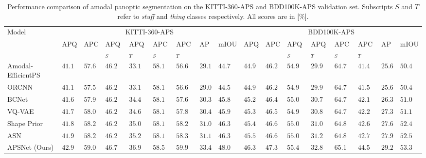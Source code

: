 \documentclass[10pt,twocolumn,letterpaper]{article}
\begin{document}
\begin{table*}
\footnotesize 
\centering
\begin{tabular}{p{2.8cm}|p{0.4cm}p{0.4cm}p{0.5cm}p{0.5cm}p{0.5cm}p{0.5cm}p{0.3cm}p{0.6cm}|p{0.4cm}p{0.4cm}p{0.5cm}p{0.5cm}p{0.5cm}p{0.5cm}p{0.3cm}p{0.5cm}}
\toprule
Model &  \multicolumn{8}{c|}{KITTI-360-APS} & \multicolumn{8}{c}{BDD100K-APS}\\
\cmidrule{2-17}
 &  APQ  & APC & APQ$_S$ &APQ$_T$ & APC$_S$&  APC$_T$ & AP & mIOU & APQ  & APC & APQ$_S$ &APQ$_T$ & APC$_S$&  APC$_T$ & AP & mIOU\\
\midrule
Amodal-EfficientPS & $41.1$ & $57.6$ & $46.2$ & $33.1$ & $58.1$ & $56.6$ & $29.1$ & $44.7$ & $44.9$ & $46.2$ & $54.9$ & $29.9$ & $64.7$ & $41.4$ & $25.6$ & $50.4$ \\
ORCNN~\cite{follmann2019learning}  & $41.1$ & $57.5$ & $46.2$ & $33.1$ & $58.1$ & $56.6$ & $29.0$ & $44.5$ & $44.9$ & $46.2$ & $54.9$ & $29.9$ & $64.7$ & $41.5$ & $25.6$ & $50.4$ \\
BCNet~\cite{Ke_2021_CVPR}  & $41.6$ & $57.9$ & $46.2$ & $34.4$ & $58.1$ & $57.6$ & $30.3$ & $45.8$ & $45.2$ & $46.4$ & $55.0$ & $30.7$ & $64.7$ & $42.1$ & $26.3$ & $51.0$ \\
VQ-VAE~\cite{jang2020learning}  & $41.7$ & $58.0$  & $46.2$ & $34.6$ & $58.1$ & $57.8$ & $30.4$ & $45.9$ & $45.3$ & $46.5$ & $54.9$ & $30.8$ & $64.7$ & $42.2$ & $27.3$ & $51.1$  \\
Shape Prior~\cite{yuting2021amodal}  & $41.8$ & $58.2$  & $46.2$ & $35.0$ & $58.1$ & $58.2$ & $31.0$ & $46.3$ & $45.4$ & $46.6$ & $55.0$ & $31.0$ & $64.8$ & $42.6$ & $27.6$ & $52.4$  \\
ASN~\cite{qi2019amodal} & $41.9$ & $58.2$ & $46.2$ & $35.2$ & $58.1$ & $58.3$ & $31.1$ & $46.3$ & $45.5$ & $46.6$ & $55.0$ & $31.2$ & $64.8$ & $42.7$ & $27.9$ & $52.5$   \\
\midrule
\mbox{APSNet} (Ours)  &  $\mathbf{42.9}$ & $\mathbf{59.0}$  & $\mathbf{46.7}$ & $\mathbf{36.9}$  & $\mathbf{58.5}$ & $\mathbf{59.9}$  & $\mathbf{33.4}$ &$\mathbf{48.0}$ & $\mathbf{46.3}$ & $\mathbf{47.3}$  & $\mathbf{55.4}$ & $\mathbf{32.8}$  & $\mathbf{65.1}$ & $\mathbf{44.5}$  & $\mathbf{29.2}$ & $\mathbf{53.3}$ \\
\bottomrule
\end{tabular}
\vspace{-0.2cm}
\caption{Performance comparison of amodal panoptic segmentation on the KITTI-360-APS and BDD100K-APS validation set. Subscripts $S$ and $T$ refer to \textit{stuff} and \textit{thing} classes respectively. All scores are in [\%].}
\label{tab:kittiEvaluation}
\vspace{-0.3cm}
\end{table*}
\end{document}
